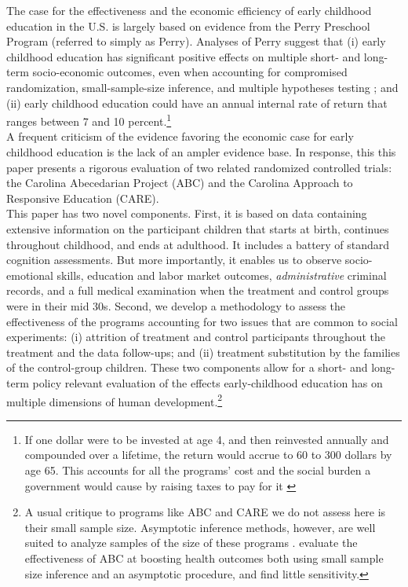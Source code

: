 \noindent  The case for the effectiveness and the economic efficiency of early childhood education in the U.S. is largely based on evidence from the Perry Preschool Program (referred to simply as Perry). Analyses of Perry suggest that (i) early childhood education has significant positive effects on multiple short- and long-term socio-economic outcomes, even when accounting for compromised randomization, small-sample-size inference, and multiple hypotheses testing \citep{Heckman_Moon_etal_2010_QE}; and (ii) early childhood education could have an annual internal rate of return that ranges between 7 and 10 percent.\footnote{If one dollar were to be invested at age 4, and then reinvested annually and compounded over a lifetime, the return would accrue to 60 to 300 dollars by age 65. This accounts for all the programs' cost and the social burden a government would cause by raising taxes to pay for it \citep{Heckman_Moon_etal_2010_RateofReturn}}\\

\noindent A frequent criticism of the evidence favoring the economic case for early childhood education is the lack of an ampler evidence base. In response, this this paper presents a rigorous evaluation of two related randomized controlled trials: the Carolina Abecedarian Project (ABC) and the Carolina Approach to Responsive Education (CARE).\\ 

\noindent This paper has two novel components. First, it is based on data containing extensive information on the participant children that starts at birth, continues throughout childhood, and ends at adulthood. It includes a battery of standard cognition assessments. But more importantly, it enables us to observe socio-emotional skills, education and labor market outcomes, \textit{administrative} criminal records, and a full medical examination when the treatment and control groups were in their mid 30s. Second, we develop a methodology to assess the effectiveness of the programs accounting for two issues that are common to social experiments: (i) attrition of treatment and control participants throughout the treatment and the data follow-ups; and (ii) treatment substitution by the families of the control-group children. These two components allow for a short- and long-term policy relevant evaluation of the effects early-childhood education has on multiple dimensions of human development.\footnote{A usual critique to programs like ABC and CARE we do not assess here is their small sample size. Asymptotic inference methods, however, are well suited to analyze samples of the size of these programs \citep{Hanushek_Lindseth_2009_BOOKSchoolhousesCourthouses}. \citet{Campbell_Conti_etal_2014_EarlyChildhoodInvestments} evaluate the effectiveness of ABC at boosting health outcomes both using small sample size inference and an asymptotic procedure, and find little sensitivity.}\\

